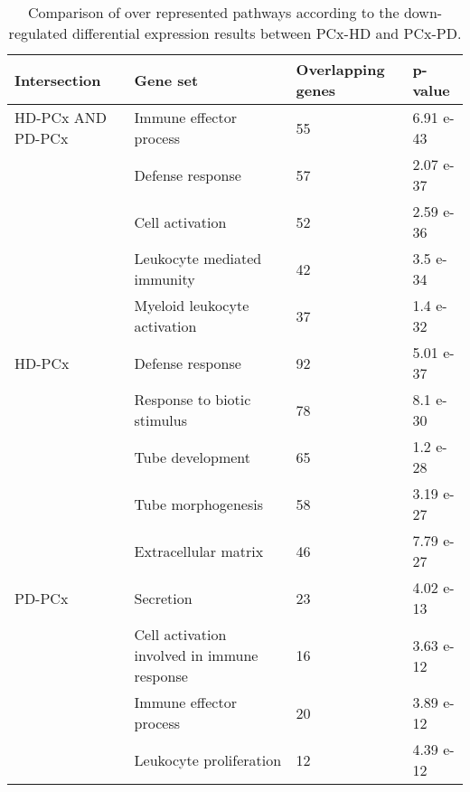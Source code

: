 \begin{table}[!ht]
\centering
\caption{Comparison of over represented pathways according to the down-regulated differential expression results between PCx-HD and PCx-PD.}
\begin{tabularx}{11cm}{L{2cm}L{2.5cm}L{3cm}C{1.5cm}}
\toprule
\textbf{Intersection} & \textbf{Gene set} & \textbf{Overlapping genes} & \textbf{p-value} \\
\midrule
HD-PCx AND PD-PCx & Immune effector process                       & 55 & 6.91 e-43 \\
                  & Defense response                              & 57 & 2.07 e-37 \\
                  & Cell activation                               & 52 & 2.59 e-36 \\
                  & Leukocyte mediated immunity                 & 42 & 3.5 e-34  \\
                  & Myeloid leukocyte activation                & 37 & 1.4 e-32  \\
HD-PCx            & Defense response                              & 92 & 5.01 e-37 \\
                  & Response to biotic stimulus                 & 78 & 8.1 e-30  \\
                  & Tube development                            & 65 & 1.2 e-28  \\
                  & Tube morphogenesis                          & 58 & 3.19 e-27 \\
                  & Extracellular matrix                        & 46 & 7.79 e-27 \\
PD-PCx            & Secretion                                     & 23 & 4.02 e-13 \\
                  & Cell activation involved in immune response & 16 & 3.63 e-12 \\
                  & Immune effector process                     & 20 & 3.89 e-12 \\
                  & Leukocyte proliferation                     & 12 & 4.39 e-12 \\
\bottomrule
\end{tabularx}
\end{table}


